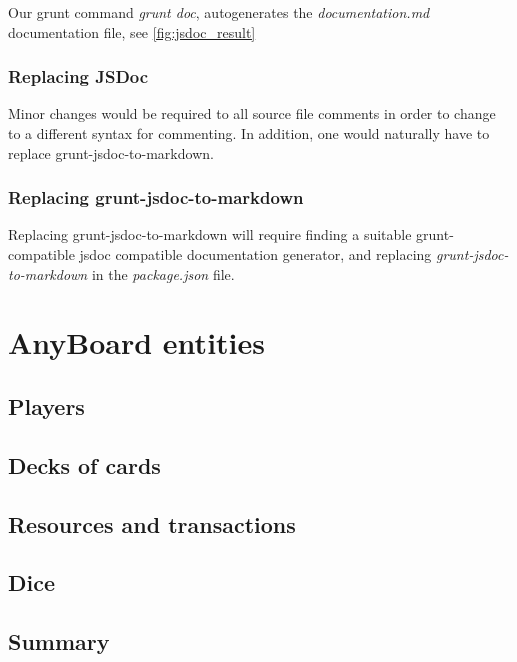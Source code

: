 Our grunt command \emph{grunt doc}, autogenerates the \emph{documentation.md} documentation file, see \ref{fig:jsdoc_result}

\subsubsection{Replacing JSDoc}
Minor changes would be required to all source file comments in order to change to a different syntax for commenting. In addition, one would naturally have to replace grunt-jsdoc-to-markdown.

\subsubsection{Replacing grunt-jsdoc-to-markdown}
Replacing grunt-jsdoc-to-markdown will require finding a suitable grunt-compatible jsdoc compatible documentation generator, and replacing \emph{grunt-jsdoc-to-markdown} in the \emph{package.json} file.

\section{AnyBoard entities} \label{impl:entities}

\subsection{Players} 


\subsection{Decks of cards}


\subsection{Resources and transactions}

\subsection{Dice}

\subsection{Summary}



